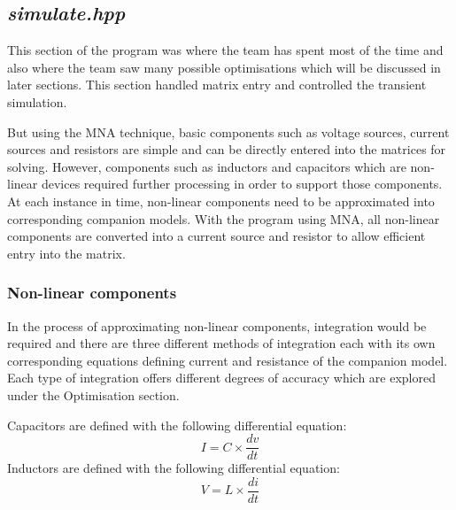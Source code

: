 \documentclass[12pt,a4paper]{article}
\begin{document}
	\subsection{\textit{simulate.hpp}}
	This section of the program was where the team has spent most of the time and also where the
	team saw many possible optimisations which will be discussed in later sections. This 
	section handled matrix entry and controlled the transient simulation. \par
	But using the MNA technique, basic components such as voltage sources, current 
	sources and resistors are simple and can be directly entered into the matrices for 
	solving. However, components such as inductors and capacitors which are non-linear
	devices required further processing in order to support those components. 
	At each instance in time, non-linear components need to be approximated into corresponding
	companion models. With the program using MNA, all non-linear components are converted 
	into a current source and resistor to allow efficient entry into the matrix.
	\subsubsection{Non-linear components}
	In the process of approximating non-linear components, integration would be 
	required and there are three different 
	methods of integration each with its own corresponding equations defining 
	current and resistance of the companion model. Each type of integration offers different
	degrees of accuracy which are explored under the Optimisation section.\par
	Capacitors are defined with the following differential equation:
	$$I=C\times \frac{dv}{dt}$$
	Inductors are defined with the following differential equation:
	$$V=L\times \frac{di}{dt}$$
	
\end{document}
